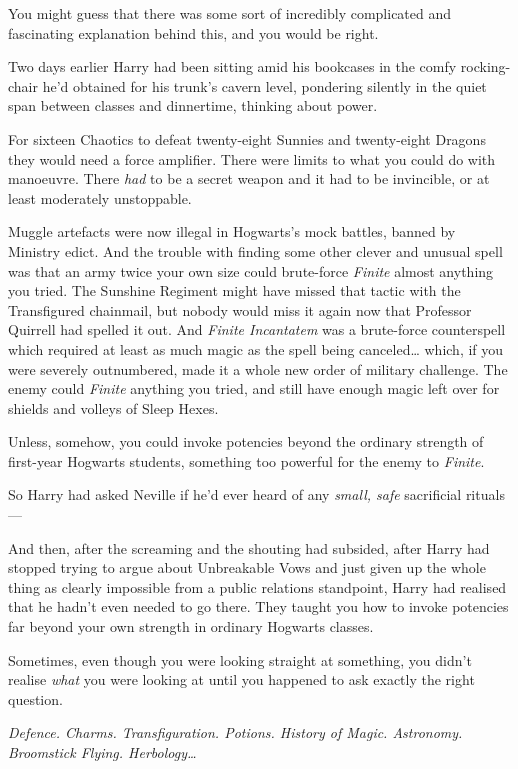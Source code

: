 You might guess that there was some sort of incredibly complicated and
fascinating explanation behind this, and you would be right.

Two days earlier Harry had been sitting amid his bookcases in the comfy
rocking-chair he'd obtained for his trunk's cavern level, pondering
silently in the quiet span between classes and dinnertime, thinking
about power.

For sixteen Chaotics to defeat twenty-eight Sunnies and twenty-eight
Dragons they would need a force amplifier. There were limits to what you
could do with manoeuvre. There \emph{had} to be a secret weapon and it
had to be invincible, or at least moderately unstoppable.

Muggle artefacts were now illegal in Hogwarts's mock battles, banned by
Ministry edict. And the trouble with finding some other clever and
unusual spell was that an army twice your own size could brute-force
\emph{Finite} almost anything you tried. The Sunshine Regiment might
have missed that tactic with the Transfigured chainmail, but nobody
would miss it again now that Professor Quirrell had spelled it out. And
\emph{Finite Incantatem} was a brute-force counterspell which required
at least as much magic as the spell being canceled\ldots{} which, if you
were severely outnumbered, made it a whole new order of military
challenge. The enemy could \emph{Finite} anything you tried, and still
have enough magic left over for shields and volleys of Sleep Hexes.

Unless, somehow, you could invoke potencies beyond the ordinary strength
of first-year Hogwarts students, something too powerful for the enemy to
\emph{Finite}.

So Harry had asked Neville if he'd ever heard of any \emph{small, safe}
sacrificial rituals---

And then, after the screaming and the shouting had subsided, after Harry
had stopped trying to argue about Unbreakable Vows and just given up the
whole thing as clearly impossible from a public relations standpoint,
Harry had realised that he hadn't even needed to go there. They taught
you how to invoke potencies far beyond your own strength in ordinary
Hogwarts classes.

Sometimes, even though you were looking straight at something, you
didn't realise \emph{what} you were looking at until you happened to ask
exactly the right question.

\emph{Defence. Charms. Transfiguration. Potions. History of Magic.
Astronomy. Broomstick Flying. Herbology\ldots{}}

